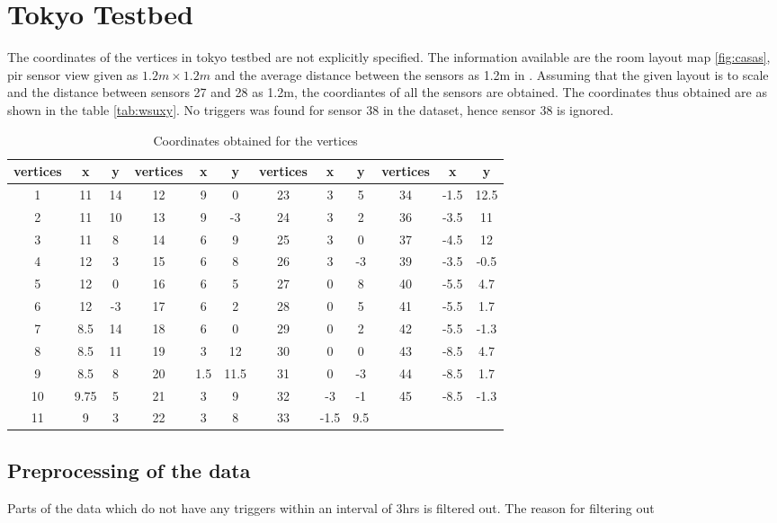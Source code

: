 \chapter{Tokyo Testbed}
\label{app:B}

The coordinates of the vertices in tokyo testbed are not explicitly specified. The information available are the room layout map \ref{fig:casas}, pir sensor view given as $1.2m \times 1.2m$ and the average distance between the sensors as 1.2m in \cite{crandall2011tracking}. Assuming that the given layout is to scale and the distance between sensors 27 and 28 as 1.2m, the coordiantes of all the sensors are obtained. The coordinates thus obtained are as shown in the table \ref{tab:wsuxy}. No triggers was found for sensor 38 in the dataset, hence sensor 38 is ignored.

\begin{table}[]
\centering
\caption{Coordinates obtained for the vertices}
\label{tab:wsuxyl}
\begin{tabular}{|c|c|c|c|c|c|c|c|c|c|c|c|}
\hline
vertices & x    & y  & vertices & x   & y       & vertices & x    & y   & vertices & x    & y    \\ \hline
1        & 11   & 14 & 12       & 9   & 0       & 23       & 3    & 5   & 34       & -1.5 & 12.5 \\ \hline
2        & 11   & 10 & 13       & 9   & -3      & 24       & 3    & 2   & 36       & -3.5 & 11   \\ \hline
3        & 11   & 8  & 14       & 6   & 9       & 25       & 3    & 0   & 37       & -4.5 & 12   \\ \hline
4        & 12   & 3  & 15       & 6   & 8       & 26       & 3    & -3  & 39       & -3.5 & -0.5 \\ \hline
5        & 12   & 0  & 16       & 6   & 5       & 27       & 0    & 8   & 40       & -5.5 & 4.7  \\ \hline
6        & 12   & -3 & 17       & 6   & 2       & 28       & 0    & 5   & 41       & -5.5 & 1.7  \\ \hline
7        & 8.5  & 14 & 18       & 6   & 0       & 29       & 0    & 2   & 42       & -5.5 & -1.3 \\ \hline
8        & 8.5  & 11 & 19       & 3   & 12      & 30       & 0    & 0   & 43       & -8.5 & 4.7  \\ \hline
9        & 8.5  & 8  & 20       & 1.5 & 11.5 & 31       & 0    & -3  & 44       & -8.5 & 1.7  \\ \hline
10       & 9.75 & 5  & 21       & 3   & 9       & 32       & -3   & -1  & 45       & -8.5 & -1.3 \\ \hline
11       & 9    & 3  & 22       & 3   & 8       & 33       & -1.5 & 9.5 &          &      &      \\ \hline
\end{tabular}
\end{table}

\section{Preprocessing of the data}

Parts of the data which do not have any triggers within an interval of 3hrs is filtered out.  The reason for filtering out 




